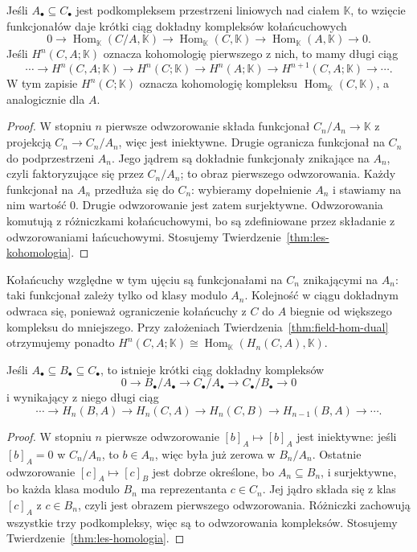 \begin{stwierdzenie}
\label{prop:wzgledna-kohomologia}
Jeśli $A_\bullet\subseteq C_\bullet$
jest podkompleksem przestrzeni liniowych
nad ciałem $\mathbb K$, to wzięcie
funkcjonałów daje krótki ciąg dokładny
kompleksów kołańcuchowych
\[
 0\to\operatorname{Hom}_{\mathbb K}
      (C/A,\mathbb K)
 \to\operatorname{Hom}_{\mathbb K}(C,\mathbb K)
 \to\operatorname{Hom}_{\mathbb K}(A,\mathbb K)
 \to0.
\]
Jeśli $H^n(C,A;\mathbb K)$ oznacza
kohomologię pierwszego z nich, to mamy
długi ciąg
\[
 \cdots\to H^n(C,A;\mathbb K)\to H^n(C;\mathbb K)
 \to H^n(A;\mathbb K)\to H^{n+1}(C,A;\mathbb K)
 \to\cdots .
\]
W tym zapisie $H^n(C;\mathbb K)$
oznacza kohomologię kompleksu
$\operatorname{Hom}_{\mathbb K}(C,\mathbb K)$,
a analogicznie dla $A$.
\end{stwierdzenie}
\begin{proof}
W stopniu $n$ pierwsze odwzorowanie składa
funkcjonał $C_n/A_n\to\mathbb K$
z projekcją $C_n\to C_n/A_n$,
więc jest iniektywne.
Drugie ogranicza funkcjonał na $C_n$
do podprzestrzeni $A_n$.
Jego jądrem są dokładnie funkcjonały
znikające na $A_n$, czyli faktoryzujące
się przez $C_n/A_n$; to obraz
pierwszego odwzorowania. Każdy funkcjonał
na $A_n$ przedłuża się do $C_n$:
wybieramy dopełnienie $A_n$
i stawiamy na nim wartość $0$.
Drugie odwzorowanie jest zatem surjektywne.
Odwzorowania komutują z różniczkami
kołańcuchowymi, bo są zdefiniowane
przez składanie z odwzorowaniami łańcuchowymi.
Stosujemy
Twierdzenie~\ref{thm:les-kohomologia}.
\end{proof}

Kołańcuchy względne w tym ujęciu są funkcjonałami na $C_n$
znikającymi na $A_n$: taki funkcjonał zależy tylko od klasy
modulo $A_n$. Kolejność w ciągu dokładnym odwraca się,
ponieważ ograniczenie kołańcuchy z $C$ do $A$ biegnie od
większego kompleksu do mniejszego. Przy założeniach
Twierdzenia~\ref{thm:field-hom-dual} otrzymujemy ponadto
$H^n(C,A;\mathbb K)\cong
\operatorname{Hom}_{\mathbb K}(H_n(C,A),\mathbb K)$.

\begin{stwierdzenie}
\label{prop:les-potrojny}
Jeśli $A_\bullet\subseteq B_\bullet
\subseteq C_\bullet$, to istnieje
krótki ciąg dokładny kompleksów
\[
 0\longrightarrow B_\bullet/A_\bullet
 \longrightarrow C_\bullet/A_\bullet
 \longrightarrow C_\bullet/B_\bullet
 \longrightarrow0
\]
i wynikający z niego długi ciąg
\[
 \cdots\to H_n(B,A)\to H_n(C,A)\to H_n(C,B)
 \to H_{n-1}(B,A)\to\cdots.
\]
\end{stwierdzenie}
\begin{proof}
W stopniu $n$ pierwsze odwzorowanie
$[b]_A\mapsto[b]_A$ jest iniektywne:
jeśli $[b]_A=0$ w $C_n/A_n$, to
$b\in A_n$, więc była już zerowa w
$B_n/A_n$. Ostatnie odwzorowanie
$[c]_A\mapsto[c]_B$ jest dobrze
określone, bo $A_n\subseteq B_n$,
i surjektywne, bo każda klasa modulo
$B_n$ ma reprezentanta $c\in C_n$.
Jej jądro składa się z klas
$[c]_A$ z $c\in B_n$, czyli jest
obrazem pierwszego odwzorowania.
Różniczki zachowują wszystkie trzy
podkompleksy, więc są to odwzorowania
kompleksów. Stosujemy
Twierdzenie~\ref{thm:les-homologia}.
\end{proof}

